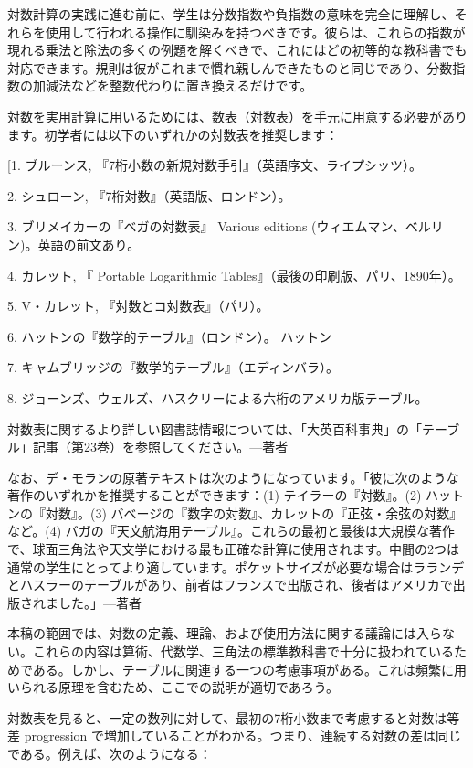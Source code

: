 \documentclass[a4paper,11pt,openany]{ltjsbook}
\begin{document}
対数計算の実践に進む前に、学生は分数指数や負指数の意味を完全に理解し、それらを使用して行われる操作に馴染みを持つべきです。彼らは、これらの指数が現れる乗法と除法の多くの例題を解くべきで、これにはどの初等的な教科書でも対応できます。規則は彼がこれまで慣れ親しんできたものと同じであり、分数指数の加減法などを整数代わりに置き換えるだけです。

対数を実用計算に用いるためには、数表（対数表）を手元に用意する必要があります。初学者には以下のいずれかの対数表を推奨します：

[1. ブルーンス, 『7桁小数の新規対数手引』（英語序文、ライプシッツ）。

2. シュローン, 『7桁対数』（英語版、ロンドン）。

3. ブリメイカーの『ベガの対数表』 Various editions (ウィエムマン、ベルリン)。英語の前文あり。

4. カレット, 『 Portable Logarithmic Tables』（最後の印刷版、パリ、1890年）。

5. V・カレット, 『対数とコ対数表』（パリ）。

6. ハットンの『数学的テーブル』（ロンドン）。
ハットン

7. キャムブリッジの『数学的テーブル』（エディンバラ）。

8. ジョーンズ、ウェルズ、ハスクリーによる六桁のアメリカ版テーブル。

対数表に関するより詳しい図書誌情報については、「大英百科事典」の「テーブル」記事（第23巻）を参照してください。---著者

なお、デ・モランの原著テキストは次のようになっています。「彼に次のような著作のいずれかを推奨することができます：(1) テイラーの『対数』。(2) ハットンの『対数』。(3) バベージの『数字の対数』、カレットの『正弦・余弦の対数』など。(4) バガの『天文航海用テーブル』。これらの最初と最後は大規模な著作で、球面三角法や天文学における最も正確な計算に使用されます。中間の2つは通常の学生にとってより適しています。ポケットサイズが必要な場合はラランデとハスラーのテーブルがあり、前者はフランスで出版され、後者はアメリカで出版されました。」---著者

本稿の範囲では、対数の定義、理論、および使用方法に関する議論には入らない。これらの内容は算術、代数学、三角法の標準教科書で十分に扱われているためである。しかし、テーブルに関連する一つの考慮事項がある。これは頻繁に用いられる原理を含むため、ここでの説明が適切であろう。

対数表を見ると、一定の数列に対して、最初の7桁小数まで考慮すると対数は等差 progression で増加していることがわかる。つまり、連続する対数の差は同じである。例えば、次のようになる：
\end{document}
